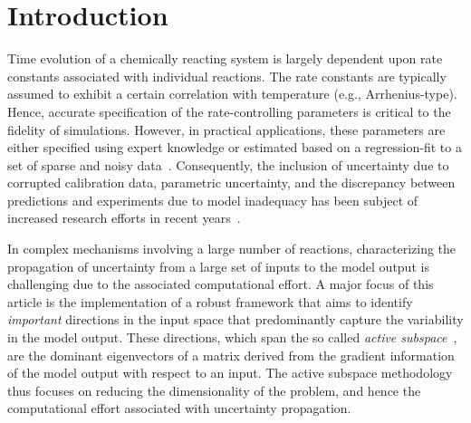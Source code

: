 \section{Introduction}
\label{sec:intro}


Time evolution of a chemically reacting system is largely dependent upon rate
constants associated with individual reactions. The rate constants are
typically assumed to exhibit a certain correlation with temperature (e.g.,
Arrhenius-type). Hence, accurate specification of the rate-controlling
parameters is critical to the fidelity of simulations. However, in practical
applications, these parameters are either specified using expert knowledge or
estimated based on a regression-fit to a set of sparse and noisy
data~\cite{Burnham:1987, Burnham:1988, Vohra:2011, Sarathy:2012}.
Consequently, the inclusion of
uncertainty due to corrupted calibration data, parametric uncertainty,
and the discrepancy between predictions and experiments
due to model inadequacy has been subject of increased research efforts in recent
years~\cite{Vohra:2014, Vohra:2017, Morrison:2018, Hantouche:2018}.  

In complex mechanisms involving a large number of reactions, characterizing the
propagation of uncertainty from a large set of inputs to the model output is
challenging due to the associated computational effort.  A major focus of this
article is the implementation of a robust framework that aims to identify
\emph{important} directions in the input space that predominantly capture the
variability in the model output. These directions, which span the so called
\emph{active subspace}~\cite{Constantine:2015}, are the dominant eigenvectors
of a matrix derived from the gradient information of the model output with
respect to an input. The active subspace methodology thus focuses on reducing
the dimensionality of the problem, and hence the computational effort
associated with uncertainty propagation. 


